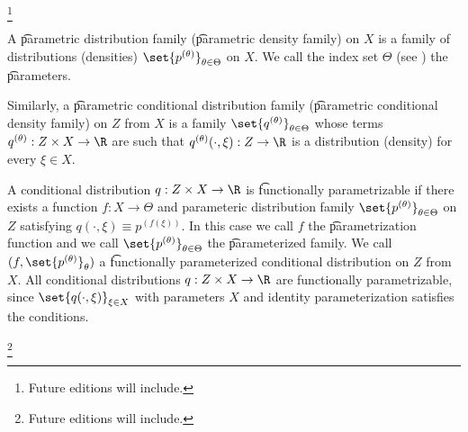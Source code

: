 
\footnote{Future editions will include.}


A \t{parametric distribution family} (\t{parametric density family}) on $X$  is a family of distributions (densities) $\set{p^{(\theta)}}_{\theta \in \Theta}$ on $X$.
We call the index set $\Theta$ (see ) the \t{parameters}.

Similarly, a \t{parametric conditional distribution family} (\t{parametric conditional density family}) on $Z$ from $X$ is a family $\set{q^{(\theta)}}_{\theta \in \Theta}$ whose terms $q^{(\theta)}: Z \times X \to \R$ are such that $q^{(\theta)}(\cdot, \xi): Z \to \R$ is a distribution (density) for every $\xi \in X$.

A conditional distribution $q: Z \times X \to \R$ is \t{functionally parametrizable} if there exists a function $f: X \to \Theta$ and parameteric distribution family $\set{p^{(\theta)}}_{\theta \in \Theta}$ on $Z$ satisfying $q(\cdot, \xi) \equiv p^{(f(\xi))}$.
In this case we call $f$ the \t{parametrization function} and we call $\set{p^{(\theta)}}_{\theta \in \Theta}$ the \t{parameterized family}.
We call $(f, \set{p^{(\theta)}}_{\theta})$ a \t{functionally parameterized conditional distribution} on $Z$ from $X$.
All conditional distributions $q: Z \times X \to \R$ are functionally parametrizable, since $\set{q(\cdot, \xi)}_{\xi \in X}$ with parameters $X$ and identity parameterization satisfies the conditions.


\footnote{Future editions will include.}

\blankpage
